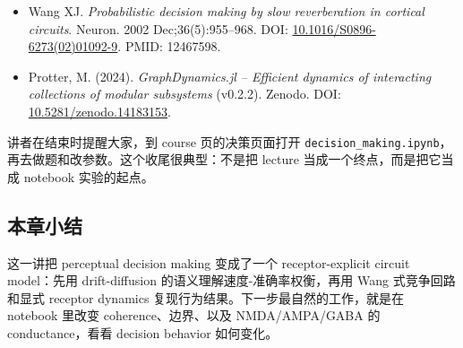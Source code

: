 \documentclass[a4paper]{article}
\begin{document}
\begin{itemize}
    \item Wang XJ. \emph{Probabilistic decision making by slow reverberation in cortical circuits}. Neuron. 2002 Dec;36(5):955--968. DOI: \href{https://doi.org/10.1016/S0896-6273(02)01092-9}{10.1016/S0896-6273(02)01092-9}. PMID: 12467598.
    \item Protter, M. (2024). \emph{GraphDynamics.jl -- Efficient dynamics of interacting collections of modular subsystems} (v0.2.2). Zenodo. DOI: \href{https://doi.org/10.5281/zenodo.14183153}{10.5281/zenodo.14183153}.
\end{itemize}

讲者在结束时提醒大家，到 course 页的决策页面打开 \texttt{decision\_making.ipynb}，再去做题和改参数。这个收尾很典型：不是把 lecture 当成一个终点，而是把它当成 notebook 实验的起点。

\subsection{本章小结}
这一讲把 perceptual decision making 变成了一个 receptor-explicit circuit model：先用 drift-diffusion 的语义理解速度-准确率权衡，再用 Wang 式竞争回路和显式 receptor dynamics 复现行为结果。下一步最自然的工作，就是在 notebook 里改变 coherence、边界、以及 NMDA/AMPA/GABA 的 conductance，看看 decision behavior 如何变化。
\end{document}
